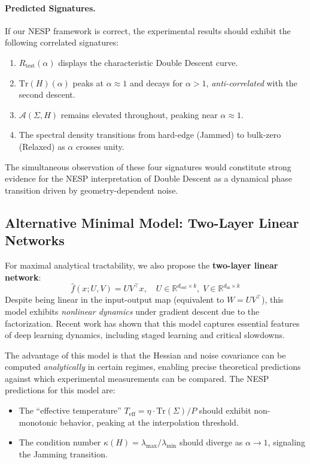 \documentclass[
  journal=largetwo,
  year=2025,
  volume=37,
]{cup-journal}
\begin{document}
\paragraph{Predicted Signatures.} If our NESP framework is correct, the experimental results should exhibit the following correlated signatures:
\begin{enumerate}
    \item $R_{\text{test}}(\alpha)$ displays the characteristic Double Descent curve.
    \item $\mathrm{Tr}(H)(\alpha)$ peaks at $\alpha \approx 1$ and decays for $\alpha > 1$, \textit{anti-correlated} with the second descent.
    \item $\mathcal{A}(\Sigma, H)$ remains elevated throughout, peaking near $\alpha \approx 1$.
    \item The spectral density transitions from hard-edge (Jammed) to bulk-zero (Relaxed) as $\alpha$ crosses unity.
\end{enumerate}

The simultaneous observation of these four signatures would constitute strong evidence for the NESP interpretation of Double Descent as a dynamical phase transition driven by geometry-dependent noise.

\subsection{Alternative Minimal Model: Two-Layer Linear Networks}

For maximal analytical tractability, we also propose the \textbf{two-layer linear network}:
\begin{equation}
    \hat{f}(x; U, V) = U V^\top x, \quad U \in \mathbb{R}^{d_{\text{out}} \times k}, \; V \in \mathbb{R}^{d_{\text{in}} \times k}
\end{equation}
Despite being linear in the input-output map (equivalent to $W = UV^\top$), this model exhibits \textit{nonlinear dynamics} under gradient descent due to the factorization. Recent work \cite{advani2017highdimensionaldynamicsgeneralizationerror,saxe2014exact} has shown that this model captures essential features of deep learning dynamics, including staged learning and critical slowdowns.

The advantage of this model is that the Hessian and noise covariance can be computed \textit{analytically} in certain regimes, enabling precise theoretical predictions against which experimental measurements can be compared. The NESP predictions for this model are:
\begin{itemize}
    \item The ``effective temperature'' $T_{\text{eff}} = \eta \cdot \mathrm{Tr}(\Sigma)/P$ should exhibit non-monotonic behavior, peaking at the interpolation threshold.
    \item The condition number $\kappa(H) = \lambda_{\max}/\lambda_{\min}$ should diverge as $\alpha \to 1$, signaling the Jamming transition.
\end{itemize}
\end{document}

